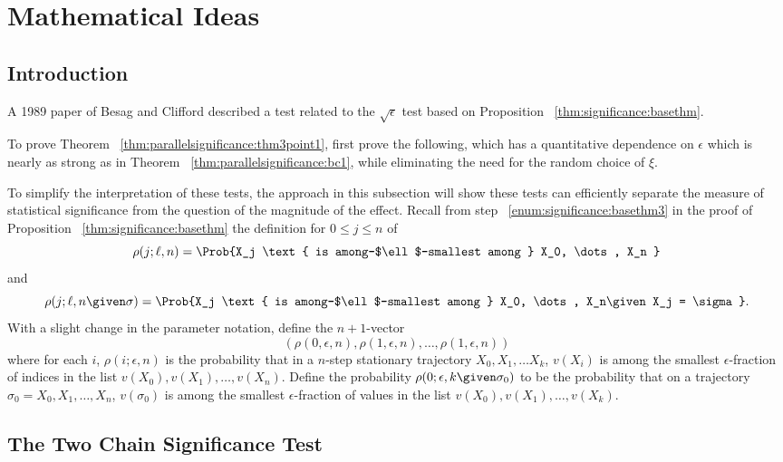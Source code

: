 \documentclass[12pt]{article}
\begin{document}
\section*{Mathematical Ideas}

\subsection*{Introduction}

A 1989 paper of Besag and Clifford
\cite{besag89} described a test related to the \( \sqrt{\epsilon} \)
test based on Proposition~%
\ref{thm:significance:basethm}.

\begin{remark}
    To prove Theorem~%
    \ref{thm:parallelsignificance:thm3point1}, first prove the following, which
    has a quantitative dependence on \( \epsilon \) which is nearly as
    strong as in Theorem~%
    \ref{thm:parallelsignificance:bc1}, while eliminating the need for the
    random choice of \( \xi \).
\end{remark}

To simplify the interpretation of these tests, the approach in this
subsection will show these tests can efficiently separate the measure of
statistical significance from the question of the magnitude of the
effect.  Recall from step~%
\ref{enum:significance:basethm3} in the proof of
Proposition~%
\ref{thm:significance:basethm} the definition for \( 0 \le j \le n \) of
\[
    \rho(j; \ell, n) = \Prob{X_j \text{ is among-$\ell$-smallest
    among } X_0, \dots, X_n }
\] and
\[
  \rho(j; \ell, n \given \sigma) = \Prob{X_j
    \text{ is among-$\ell$-smallest among } X_0, \dots, X_n%
    \given X_j = \sigma }.
\] With a slight change in the parameter notation, define the \( n+1 \)-vector
\[ (\rho(0, \epsilon, n), \rho(1, \epsilon, n), \dots, \rho(1, \epsilon,
  n)) \]
where for each \( i \), \( \rho(i; \epsilon, n) \) is the
probability that in a \( n \)-step stationary trajectory \( X_0, X_1,
\dots X_k \), \( v(X_i) \) is among the smallest \( \epsilon
\)-fraction of indices
in the list \( v(X_0), v(X_1), \dots, v(X_n) \).  Define the probability
\( \rho(0; \epsilon, k \given \sigma_0) \) to be the probability that on a
trajectory \( \sigma_0 = X_0, X_1, \dots, X_n \), \( v(\sigma_0) \) is
among the smallest \( \epsilon \)-fraction of values in the list \( v(X_0),
v(X_1), \dots, v(X_k) \).

\subsection*{The Two Chain Significance Test}
\end{document}
